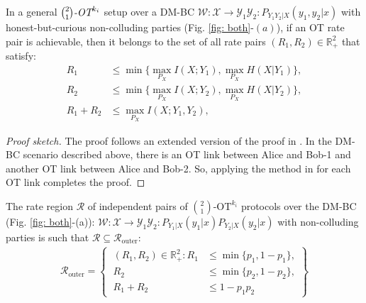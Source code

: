 \documentclass[runningheads]{llncs}
\newcounter{protocol}
\begin{document}
\begin{theorem}\label{thm:BC-ncoll}
    In a general $\binom{2}{1}\emph{-OT}^{k_i}$ setup over a DM-BC $\mathcal{W}:\mathcal{X}\rightarrow \mathcal{Y}_1\mathcal{Y}_2:P_{Y_1Y_2|X}(y_1,y_2|x)$ with honest-but-curious non-colluding  parties (Fig. \ref{fig: both}-$(a)$), if an OT rate pair is achievable, then it belongs to the set of all rate pairs $(R_1,R_2)\in\mathbb{R}^2_{+}$ that satisfy:
    \begin{align*}
        R_1 &\leq \min\Big\{\max_{P_{X}}I(X;Y_1),\max_{P_{X}}H(X|Y_1)\Big\},\\
        R_2 &\leq \min\Big\{\max_{P_{X}}I(X;Y_2),\max_{P_{X}}H(X|Y_2)\Big\},\\
        R_1+R_2 &\leq \max_{P_X}I(X;Y_1,Y_2),
    \end{align*}
\end{theorem}
\begin{proof}[Proof sketch] The proof follows an extended version of the proof in \cite[Theorem 1]{Rudolf1}. In the DM-BC scenario described above, there is an OT link between Alice and Bob-1 and another OT link between Alice and Bob-2. So, applying the method in \cite[Theorem 1]{Rudolf1} for each OT link completes the proof. 
\end{proof}
\begin{proposition}
    The rate region $\mathcal{R}$ of independent pairs of $\binom{2}{1}\text{-OT}^{k_i}$ protocols over the DM-BC  (Fig. \ref{fig: both}-(a)): $\mathcal{W}:\mathcal{X}\rightarrow \mathcal{Y}_1\mathcal{Y}_2:P_{Y_1|X}(y_1|x)P_{Y_2|X}(y_2|x)$ with non-colluding parties is such that $\mathcal{R}\subseteq\mathcal{R}_{\text{outer}}$:
    \begin{align*}
    \mathcal{R}_{\text{outer}} = \left\{\ 
    \begin{aligned}
    (R_1,R_2)\in\mathbb{R}^2_{+}:R_1 &\leq \min\{p_1, 1 - p_1\}, \\
    R_2 &\leq \min\{p_2, 1 - p_2\}, \\
    R_1 + R_2 &\leq  1-p_1p_2
    \end{aligned}
    \right\}
    \end{align*}
\end{proposition}
\end{document}
